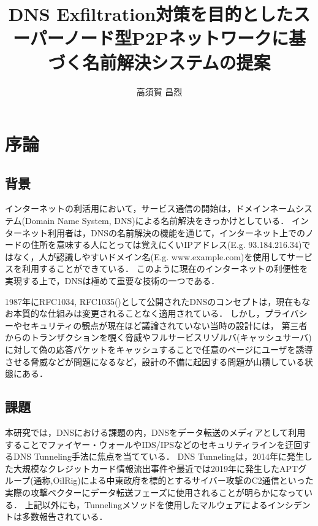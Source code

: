 \documentclass[12pt]{jarticle} %
\title{DNS Exfiltration対策を目的としたスーパーノード型P2Pネットワークに基づく名前解決システムの提案}
\author{高須賀 昌烈}
\begin{document}
\titlepage
\cmemberspage
\firstabstract
\secondabstract



\toc
\newpage
\listoffigures
\listoftables



\newpage
{}
\section{序論}
\subsection{背景}
インターネットの利活用において，サービス通信の開始は，ドメインネームシステム(Domain Name System, DNS)による名前解決をきっかけとしている．
インターネット利用者は，DNSの名前解決の機能を通じて，インターネット上でのノードの住所を意味する人にとっては覚えにくいIPアドレス(E.g. 93.184.216.34)ではなく，人が認識しやすいドメイン名(E.g. www.example.com)を使用してサービスを利用することができている．
このように現在のインターネットの利便性を実現する上で，DNSは極めて重要な技術の一つである．

1987年にRFC1034, RFC1035(\cite{rfc1034, rfc1035})として公開されたDNSのコンセプトは，現在もなお本質的な仕組みは変更されることなく適用されている．
しかし，プライバシーやセキュリティの観点が現在ほど議論されていない当時の設計には，
第三者からのトランザクションを覗く脅威やフルサービスリゾルバ(キャッシュサーバ)に対して偽の応答パケットをキャッシュすることで任意のページにユーザを誘導させる脅威などが問題になるなど，設計の不備に起因する問題が山積している状態にある．

\subsection{課題}
本研究では，DNSにおける課題の内，DNSをデータ転送のメディアとして利用することでファイヤー・ウォールやIDS/IPSなどのセキュリティラインを迂回するDNS Tunneling手法に焦点を当てている．
DNS Tunnelingは，2014年に発生した大規模なクレジットカード情報流出事件\cite{frameworkpos}や最近では2019年に発生したAPTグループ(通称,OilRig)による中東政府を標的とするサイバー攻撃のC2通信\cite{bondupdater}といった実際の攻撃ベクターにデータ転送フェーズに使用されることが明らかになっている．
上記以外にも，Tunnelingメソッドを使用したマルウェアによるインシデントは多数報告されている\cite{bernhardpos, multigrainpos, pisloader, denis, dnsmessenger, udpos}．
\end{document}
